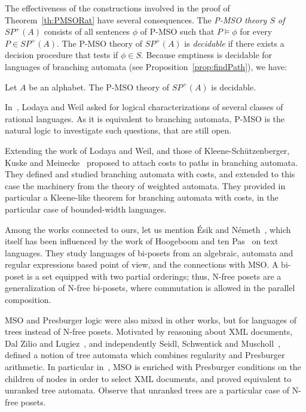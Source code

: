 \documentclass{CSML}
\begin{document}
The effectiveness of the constructions involved in the proof of Theorem~\ref{th:PMSORat} have several consequences.
The \emph{P-MSO theory $S$ of $SP^+(A)$} consists of all sentences $\phi$ of P-MSO such that $P\models\phi$ for every $P\in SP^+(A)$. The P-MSO theory of $SP^+(A)$ is \emph{decidable} if there exists a decision procedure that tests if $\phi\in S$.
Because emptiness is decidable for languages of branching automata (see Proposition~\ref{prop:findPath}), we have:
\begin{thm}
  \label{th:PMSODecidable}
  Let $A$ be an alphabet.
  The P-MSO theory of $SP^+(A)$ is decidable.
\end{thm}

In~\cite{LW00:sp}, Lodaya and Weil asked for logical characterizations of several classes of rational languages. 
As it is equivalent to branching automata, P-MSO is the natural logic to investigate such questions, that are still open.

Extending the work of Lodaya and Weil, and those of Kleene-Sch\"utzenberger, Kuske and Meinecke~\cite{Kuske200453} proposed to attach costs to paths in branching automata. They defined and studied branching automata with costs, and extended to this case the machinery from the theory of weighted automata. They provided in particular a Kleene-like theorem for branching automata with costs, in the particular case of bounded-width languages.

Among the works connected to ours, let us mention \'Esik and N{\'e}meth~\cite{EN01}, which itself has been influenced by the work of Hoogeboom and ten Pas~\cite{HtP:1996,HtP:1997} on text languages. They study languages of bi-posets from an algebraic, automata and regular expressions based point of view, and the connections with MSO. A bi-poset is a set equipped with two partial orderings; thus, N-free posets are a generalization of N-free bi-posets, where commutation is allowed in the parallel composition. 

MSO and Presburger logic were also mixed in other works, but for languages of trees instead of N-free posets. Motivated by reasoning about XML documents, Dal Zilio and Lugiez~\cite{DBLP:conf/rta/Dal-ZilioL03}, and independently Seidl, Schwentick and Muscholl~\cite{DBLP:conf/birthday/SeidlSM08}, defined a notion of tree automata which combines regularity and Presburger arithmetic. In particular in~\cite{DBLP:conf/birthday/SeidlSM08}, MSO is enriched with Presburger conditions on the children of nodes in order to select XML documents, and proved equivalent to unranked tree automata. Observe that unranked trees are a particular case of N-free posets.
\end{document}
